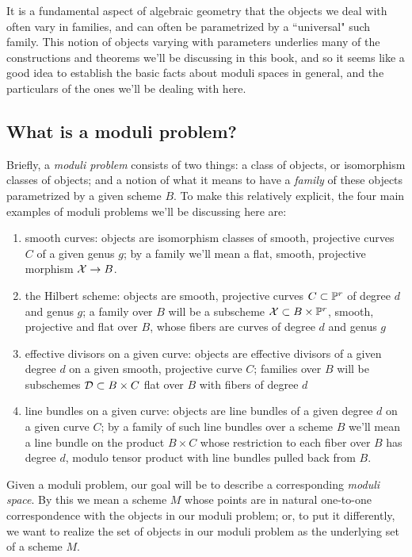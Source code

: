 It is a fundamental aspect of algebraic geometry that the objects we deal with often vary in families, and can often be parametrized by a ``universal" such family. This notion of objects varying with parameters underlies many of the constructions and theorems we'll be discussing in this book, and so it seems like a good idea to establish the basic facts about moduli spaces in general, and the particulars of the ones we'll be dealing with here. 

\subsection{What is a moduli problem?}

Briefly, a \emph{moduli problem} consists of two things: a class of objects, or isomorphism classes of objects; and a notion of what it means to have a \emph{family} of these objects parametrized by a given scheme $B$. To make this relatively explicit, the four main examples of moduli problems we'll be discussing here are:

\begin{enumerate}
\item  smooth curves: objects are isomorphism classes  of smooth, projective curves $C$ of a given genus $g$; by a family we'll mean a flat, smooth, projective morphism $\cX \to B$.

\item the Hilbert scheme: objects are smooth, projective curves $C \subset \PP^r$ of degree $d$ and genus $g$; a family over $B$ will be a subscheme $\cX \subset B \times \PP^r$, smooth, projective and flat over $B$, whose fibers are curves of degree $d$ and genus $g$

\item effective divisors on a given curve: objects are effective divisors of a given degree $d$ on a given smooth, projective curve $C$; families over $B$ will be subschemes $\cD \subset B \times C$ flat over $B$ with fibers of degree $d$

\item line bundles on a given curve: objects are line bundles of a given degree $d$ on a given curve $C$; by a family of such line bundles over a scheme $B$ we'll mean a line bundle on the product $B \times C$ whose restriction to each fiber over $B$ has degree $d$, modulo tensor product with line bundles pulled back from $B$.
\end{enumerate}

Given a moduli problem, our goal will be to describe a corresponding \emph{moduli space}. By this we mean a scheme $M$ whose points are in natural one-to-one correspondence with the objects in our moduli problem; or, to put it differently, we want to realize the set of objects in our moduli problem as the underlying set of a scheme $M$.

